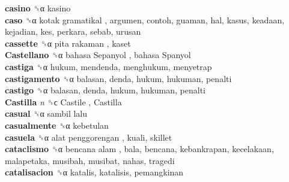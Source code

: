 \textbf{casino} ␝α  kasino  \\
\textbf{caso} ␝α   kotak gramatikal , argumen, contoh, guaman, hal, kasus, keadaan, kejadian, kes, perkara, sebab, urusan  \\
\textbf{cassette} ␝α   pita rakaman , kaset  \\
\textbf{Castellano} ␝α   bahasa Sepanyol ,  bahasa Spanyol   \\
\textbf{castiga} ␝α  hukum, mendenda, menghukum, menyetrap  \\
\textbf{castigamento} ␝α  balasan, denda, hukum, hukuman, penalti  \\
\textbf{castigo} ␝α  balasan, denda, hukum, hukuman, penalti  \\
\textbf{Castilla} \emph{n}  ␝ϲ   Castile ,  Castilla   \\
\textbf{casual} ␝α   sambil lalu   \\
\textbf{casualmente} ␝α  kebetulan  \\
\textbf{casuela} ␝α   alat penggorengan , kuali, skillet  \\
\textbf{cataclismo} ␝α   bencana alam , bala, bencana, kebankrapan, kecelakaan, malapetaka, musibah, musibat, nahas, tragedi  \\
\textbf{catalisacion} ␝α  katalis, katalisis, pemangkinan  \\

